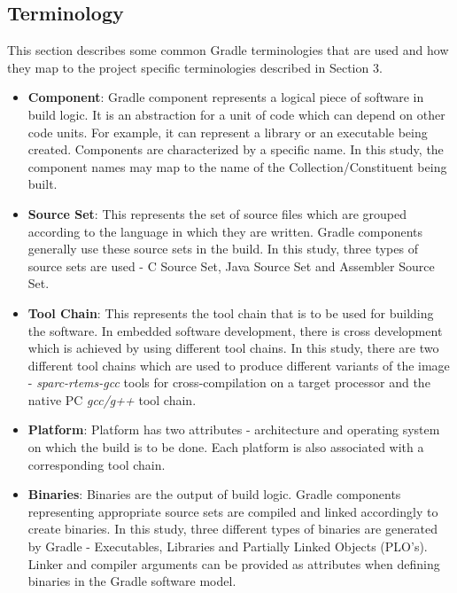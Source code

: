 \documentclass[12pt, a4paper, titlepage]{scrartcl}
\begin{document}
\subsection{Terminology} 
 This section describes some common Gradle terminologies that are used and how they map to the project specific terminologies described in Section 3.

\begin{itemize}
\item{\textbf{Component}}: Gradle component represents a logical piece of software in build logic. It is an abstraction for a unit of code which can depend on other code units. For example, it can represent a library or an executable being created. Components are characterized by a specific name. In this study, the component names may map to the name of the Collection/Constituent being built. 
\item{\textbf{Source Set}}: This represents the set of source files which are grouped according to the language in which they are written. Gradle components generally use these source sets in the build. In this study, three types of source sets are used - C Source Set, Java Source Set and Assembler Source Set. 
\item{\textbf{Tool Chain}}: This represents the tool chain that is to be used for building the software. In embedded software development, there is cross development which is achieved by using different tool chains. In this study, there are two different tool chains which are used to produce different variants of the image - \emph{sparc-rtems-gcc} tools for cross-compilation on a target processor and the native PC \emph{gcc/g++} tool chain.  
\item{\textbf{Platform}}: Platform has two attributes - architecture and operating system on which the build is to be done. Each platform is also associated with a corresponding tool chain. 
\item{\textbf{Binaries}}: Binaries are the output of build logic. Gradle components representing appropriate source sets are compiled and linked accordingly to create binaries. In this study, three different types of binaries are generated by Gradle - Executables, Libraries and Partially Linked Objects (PLO's). Linker and compiler arguments can be provided as attributes when defining binaries in the Gradle software model. 
\end{itemize}
\end{document}
